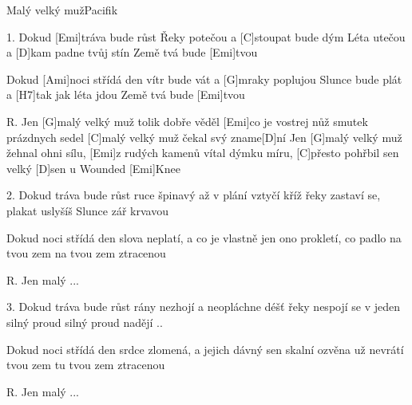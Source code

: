 \begin{song}{Malý velký muž}{Pacifik}


\begin{xverse}{1. }
Dokud [Emi]tráva bude růst
Řeky potečou a [C]stoupat bude dým
Léta utečou a [D]kam padne tvůj stín
Země tvá bude [Emi]tvou

Dokud [Ami]noci střídá den
vítr bude vát a [G]mraky poplujou
Slunce bude plát a [H7]tak jak léta jdou
Země tvá bude [Emi]tvou
\end{xverse}


\begin{xverse}{R. }
Jen [G]malý velký muž
tolik dobře věděl [Emi]co je vostrej nůž
smutek prázdnych sedel
[C]malý velký muž čekal svý zname[D]ní
Jen [G]malý velký muž
žehnal ohni sílu, [Emi]z rudých kamenů
vítal dýmku míru, [C]přesto pohřbil sen
velký [D]sen u Wounded [Emi]Knee
\end{xverse}


\begin{xverse}{2. }
Dokud tráva bude růst
ruce špinavý až v plání vztyčí kříž
řeky zastaví se, plakat uslyšíš
Slunce zář krvavou

Dokud noci střídá den
slova neplatí, a co je vlastně jen
ono prokletí, co padlo na tvou zem
na tvou zem ztracenou
\end{xverse}


\begin{xverse}{R. }
Jen malý ...
\end{xverse}

\begin{xverse}{3. }
Dokud tráva bude růst
rány nezhojí a neopláchne déšť
řeky nespojí se v jeden silný proud
silný proud nadějí ..

Dokud noci střídá den
srdce zlomená, a jejich dávný sen
skalní ozvěna už nevrátí tvou zem
tu tvou zem ztracenou
\end{xverse}

\begin{xverse}{R. }
Jen malý ...
\end{xverse}
\end{song}

